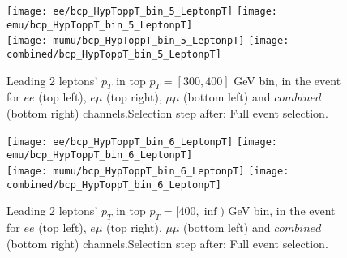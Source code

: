 \begin{figure}
  \texttt{[image: ee/bcp\_HypToppT\_bin\_5\_LeptonpT]}
  \texttt{[image: emu/bcp\_HypToppT\_bin\_5\_LeptonpT]}\\
  \texttt{[image: mumu/bcp\_HypToppT\_bin\_5\_LeptonpT]}
  \texttt{[image: combined/bcp\_HypToppT\_bin\_5\_LeptonpT]}
\caption{Leading 2 leptons' $p_T$ in top $p_T = [300,400]$ GeV bin, in the event for $ee$ (top left), $e\mu$ (top right), $\mu\mu$ (bottom left) and $combined$ (bottom right) channels.\newline Selection step after: Full event selection.}
\end{figure}

\clearpage
\newpage

\begin{figure}
  \texttt{[image: ee/bcp\_HypToppT\_bin\_6\_LeptonpT]}
  \texttt{[image: emu/bcp\_HypToppT\_bin\_6\_LeptonpT]}\\
  \texttt{[image: mumu/bcp\_HypToppT\_bin\_6\_LeptonpT]}
  \texttt{[image: combined/bcp\_HypToppT\_bin\_6\_LeptonpT]}
\caption{Leading 2 leptons' $p_T$ in top $p_T = [400,\inf)$ GeV bin, in the event for $ee$ (top left), $e\mu$ (top right), $\mu\mu$ (bottom left) and $combined$ (bottom right) channels.\newline Selection step after: Full event selection.}
\end{figure}

\clearpage
\newpage







% 


